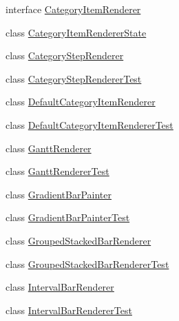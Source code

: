 \begin{DoxyCompactItemize}
\item 
interface \mbox{\hyperlink{interfaceorg_1_1jfree_1_1chart_1_1renderer_1_1category_1_1_category_item_renderer}{Category\+Item\+Renderer}}
\item 
class \mbox{\hyperlink{classorg_1_1jfree_1_1chart_1_1renderer_1_1category_1_1_category_item_renderer_state}{Category\+Item\+Renderer\+State}}
\item 
class \mbox{\hyperlink{classorg_1_1jfree_1_1chart_1_1renderer_1_1category_1_1_category_step_renderer}{Category\+Step\+Renderer}}
\item 
class \mbox{\hyperlink{classorg_1_1jfree_1_1chart_1_1renderer_1_1category_1_1_category_step_renderer_test}{Category\+Step\+Renderer\+Test}}
\item 
class \mbox{\hyperlink{classorg_1_1jfree_1_1chart_1_1renderer_1_1category_1_1_default_category_item_renderer}{Default\+Category\+Item\+Renderer}}
\item 
class \mbox{\hyperlink{classorg_1_1jfree_1_1chart_1_1renderer_1_1category_1_1_default_category_item_renderer_test}{Default\+Category\+Item\+Renderer\+Test}}
\item 
class \mbox{\hyperlink{classorg_1_1jfree_1_1chart_1_1renderer_1_1category_1_1_gantt_renderer}{Gantt\+Renderer}}
\item 
class \mbox{\hyperlink{classorg_1_1jfree_1_1chart_1_1renderer_1_1category_1_1_gantt_renderer_test}{Gantt\+Renderer\+Test}}
\item 
class \mbox{\hyperlink{classorg_1_1jfree_1_1chart_1_1renderer_1_1category_1_1_gradient_bar_painter}{Gradient\+Bar\+Painter}}
\item 
class \mbox{\hyperlink{classorg_1_1jfree_1_1chart_1_1renderer_1_1category_1_1_gradient_bar_painter_test}{Gradient\+Bar\+Painter\+Test}}
\item 
class \mbox{\hyperlink{classorg_1_1jfree_1_1chart_1_1renderer_1_1category_1_1_grouped_stacked_bar_renderer}{Grouped\+Stacked\+Bar\+Renderer}}
\item 
class \mbox{\hyperlink{classorg_1_1jfree_1_1chart_1_1renderer_1_1category_1_1_grouped_stacked_bar_renderer_test}{Grouped\+Stacked\+Bar\+Renderer\+Test}}
\item 
class \mbox{\hyperlink{classorg_1_1jfree_1_1chart_1_1renderer_1_1category_1_1_interval_bar_renderer}{Interval\+Bar\+Renderer}}
\item 
class \mbox{\hyperlink{classorg_1_1jfree_1_1chart_1_1renderer_1_1category_1_1_interval_bar_renderer_test}{Interval\+Bar\+Renderer\+Test}}
\item 

\end{DoxyCompactItemize}
